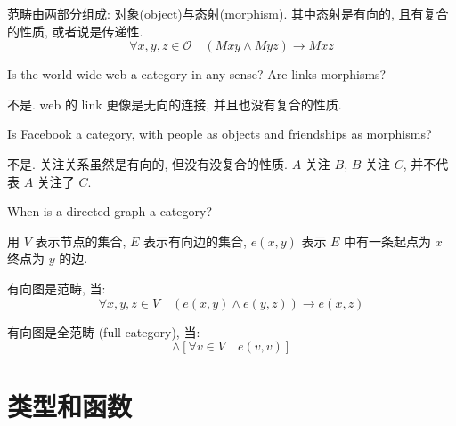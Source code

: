\documentclass[lang=cn]{elegantbook}
\begin{document}
范畴由两部分组成: 对象(object)与态射(morphism). 其中态射是有向的, 且有复合的性质, 或者说是传递性. 
\begin{equation*}
    \forall x,y,z \in \mathcal{O}\quad (Mxy \wedge Myz) \rightarrow Mxz
\end{equation*}


\begin{exercise}
Is the world-wide web a category in any sense? Are links morphisms?
\end{exercise}

\begin{solution}

不是. web 的 link 更像是无向的连接, 并且也没有复合的性质.
\end{solution}

\begin{exercise}
Is Facebook a category, with people as objects and friendships as morphisms?
\end{exercise}

\begin{solution}

不是. 关注关系虽然是有向的, 但没有没复合的性质. $A$ 关注 $B$, $B$ 关注 $C$, 并不代表 $A$ 关注了 $C$.
\end{solution}

\begin{exercise}
When is a directed graph a category?
\end{exercise}

\begin{solution}

用 $V$ 表示节点的集合, $E$ 表示有向边的集合, $e(x, y)$ 表示 $E$ 中有一条起点为 $x$ 终点为 $y$ 的边.

有向图是范畴, 当:
\begin{equation*}
    \forall x, y, z\in V \quad (e(x, y) \wedge e(y, z)) \rightarrow e(x, z)
\end{equation*}

有向图是全范畴 (full category), 当:
\begin{equation*}
    [\forall x, y, z\in V \quad (e(x, y) \wedge e(y, z)) \rightarrow e(x, z)] \wedge [\forall v \in V \quad e(v, v)]
\end{equation*}

\end{solution}

\chapter{类型和函数}
\end{document}
